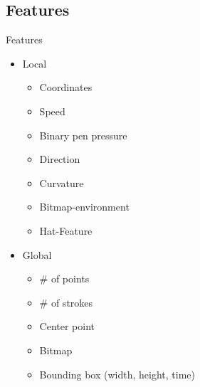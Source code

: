 \subsection{Features}
\begin{frame}{Features}
    \begin{itemize}
        \item Local
        \begin{itemize}
            \item Coordinates
            \item Speed
            \item Binary pen pressure
            \item Direction
            \item Curvature
            \item Bitmap-environment
            \item Hat-Feature
        \end{itemize}
        \item Global
        \begin{itemize}
            \item \# of points
            \item \# of strokes
            \item Center point
            \item Bitmap
            \item Bounding box (width, height, time)
        \end{itemize}
    \end{itemize}
\end{frame}